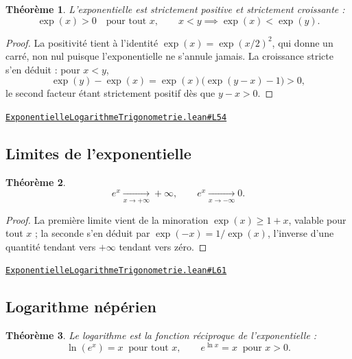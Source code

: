 \documentclass[11pt,a4paper]{article}
\theoremstyle{definition}
\theoremstyle{plain}
\newtheorem{theoreme}{Théorème}
\newcommand{\source}[2]{\par\smallskip\noindent\hfill{\footnotesize\href{#1}{\texttt{#2}}}\par\smallskip}
\begin{document}
\begin{theoreme}
L'exponentielle est strictement positive et strictement croissante :
\[ \exp(x) > 0 \quad \text{pour tout } x, \qquad
   x < y \implies \exp(x) < \exp(y) . \]
\end{theoreme}

\begin{proof}
La positivité tient à l'identité
$\exp(x) = \exp(x/2)^{2}$, qui donne un carré, non nul puisque l'exponentielle ne s'annule
jamais. La croissance stricte s'en déduit : pour $x < y$,
\[ \exp(y) - \exp(x) = \exp(x)\bigl(\exp(y - x) - 1\bigr) > 0 , \]
le second facteur étant strictement positif dès que $y - x > 0$.
\end{proof}
\source{https://github.com/Commutator-IO/learn-lean/blob/main/courses/02-lycee/05-exponentielle-logarithme-trigonometrie/ExponentielleLogarithmeTrigonometrie.lean\#L54}{ExponentielleLogarithmeTrigonometrie.lean\#L54}

\subsection{Limites de l'exponentielle}

\begin{theoreme}
\[ e^{x} \xrightarrow[x \to +\infty]{} +\infty , \qquad
   e^{x} \xrightarrow[x \to -\infty]{} 0 . \]
\end{theoreme}

\begin{proof}
La première limite vient de la minoration $\exp(x) \ge 1 + x$, valable pour tout $x$ ; la seconde s'en déduit par
$\exp(-x) = 1/\exp(x)$, l'inverse d'une quantité tendant vers $+\infty$ tendant vers zéro.
\end{proof}
\source{https://github.com/Commutator-IO/learn-lean/blob/main/courses/02-lycee/05-exponentielle-logarithme-trigonometrie/ExponentielleLogarithmeTrigonometrie.lean\#L61}{ExponentielleLogarithmeTrigonometrie.lean\#L61}

\subsection{Logarithme népérien}

\begin{theoreme}
Le logarithme est la fonction réciproque de l'exponentielle :
\[ \ln(e^{x}) = x \ \text{ pour tout } x, \qquad
   e^{\ln x} = x \ \text{ pour } x > 0 . \]
\end{theoreme}
\end{document}
